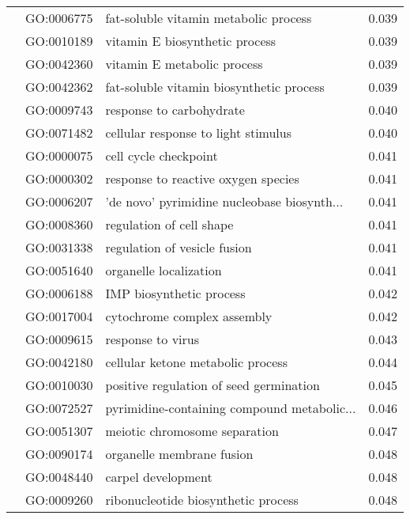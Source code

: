 \begin{longtable}{lllr}
   & GO:0006775 &        fat-soluble vitamin metabolic process &         0.039 \\
   & GO:0010189 &               vitamin E biosynthetic process &         0.039 \\
   & GO:0042360 &                  vitamin E metabolic process &         0.039 \\
   & GO:0042362 &     fat-soluble vitamin biosynthetic process &         0.039 \\
   & GO:0009743 &                     response to carbohydrate &         0.040 \\
   & GO:0071482 &          cellular response to light stimulus &         0.040 \\
   & GO:0000075 &                        cell cycle checkpoint &         0.041 \\
   & GO:0000302 &          response to reactive oxygen species &         0.041 \\
   & GO:0006207 &  'de novo' pyrimidine nucleobase biosynth... &         0.041 \\
   & GO:0008360 &                     regulation of cell shape &         0.041 \\
   & GO:0031338 &                 regulation of vesicle fusion &         0.041 \\
   & GO:0051640 &                       organelle localization &         0.041 \\
   & GO:0006188 &                     IMP biosynthetic process &         0.042 \\
   & GO:0017004 &                  cytochrome complex assembly &         0.042 \\
   & GO:0009615 &                            response to virus &         0.043 \\
   & GO:0042180 &            cellular ketone metabolic process &         0.044 \\
   & GO:0010030 &      positive regulation of seed germination &         0.045 \\
   & GO:0072527 &  pyrimidine-containing compound metabolic... &         0.046 \\
   & GO:0051307 &                meiotic chromosome separation &         0.047 \\
   & GO:0090174 &                    organelle membrane fusion &         0.048 \\
   & GO:0048440 &                           carpel development &         0.048 \\
   & GO:0009260 &          ribonucleotide biosynthetic process &         0.048 \\

\end{longtable}
